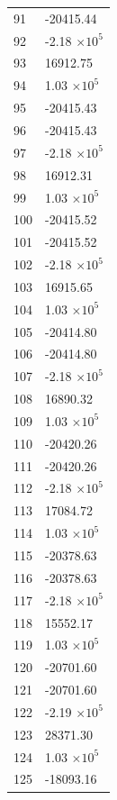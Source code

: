 \documentclass[a4paper,11pt]{article}
\begin{document}
\begin{center}
\begin{longtable}{|R{1.5cm}|R{2.6cm}|}
   91 &    -20415.44 \\
   92 &        -2.18 $\times 10^{           5}$ \\
   93 &     16912.75 \\
   94 &         1.03 $\times 10^{           5}$ \\
   95 &    -20415.43 \\
   96 &    -20415.43 \\
   97 &        -2.18 $\times 10^{           5}$ \\
   98 &     16912.31 \\
   99 &         1.03 $\times 10^{           5}$ \\
  100 &    -20415.52 \\
  101 &    -20415.52 \\
  102 &        -2.18 $\times 10^{           5}$ \\
  103 &     16915.65 \\
  104 &         1.03 $\times 10^{           5}$ \\
  105 &    -20414.80 \\
  106 &    -20414.80 \\
  107 &        -2.18 $\times 10^{           5}$ \\
  108 &     16890.32 \\
  109 &         1.03 $\times 10^{           5}$ \\
  110 &    -20420.26 \\
  111 &    -20420.26 \\
  112 &        -2.18 $\times 10^{           5}$ \\
  113 &     17084.72 \\
  114 &         1.03 $\times 10^{           5}$ \\
  115 &    -20378.63 \\
  116 &    -20378.63 \\
  117 &        -2.18 $\times 10^{           5}$ \\
  118 &     15552.17 \\
  119 &         1.03 $\times 10^{           5}$ \\
  120 &    -20701.60 \\
  121 &    -20701.60 \\
  122 &        -2.19 $\times 10^{           5}$ \\
  123 &     28371.30 \\
  124 &         1.03 $\times 10^{           5}$ \\
  125 &    -18093.16 \\

\end{longtable}
\end{center}
\end{document}
